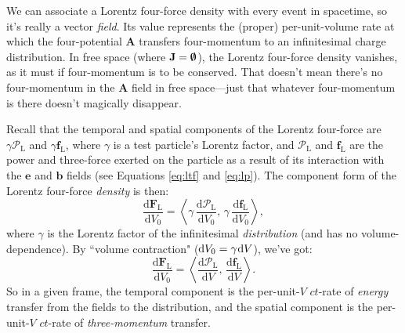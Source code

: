\documentclass[12pt]{article}
\renewcommand{\vv}[1]{\mathbf{#1}}
\newcommand{\dd}[1]{\mathrm{d}#1}
\begin{document}
We can associate a Lorentz four-force density with every event in spacetime, so it's really a vector \emph{field}. Its value represents the (proper) per-unit-volume rate at which the four-potential $\vv A$ transfers four-momentum to an infinitesimal charge distribution. In free space (where $\vv J = \textrm{\mbox{\boldmath $\emptyset$}}$), the Lorentz four-force density vanishes, as it must if four-momentum is to be conserved. That doesn't mean there's no four-momentum in the $\vv A$ field in free space---just that whatever four-momentum is there doesn't magically disappear.

Recall that the temporal and spatial components of the Lorentz four-force are $\gamma \mathcal{P}_{\mathrm{L}}$ and $\gamma \vv f_{\textrm{L}}$, where $\gamma$ is a test particle's Lorentz factor, and $\mathcal{P}_{\mathrm{L}}$ and $\vv f_{\textrm{L}}$ are the power and three-force exerted on the particle as a result of its interaction with the $\vv e$ and $\vv b$ fields (see Equations \ref{eq:ltf} and \ref{eq:lp}). The component form of the Lorentz four-force \emph{density} is then:
\begin{equation*}
\dfrac{\dd \vv F_{\mathrm{L}}}{\dd V_0} = \left \langle \gamma \, \dfrac{\dd \mathcal{P}_{\textrm{L}} }{\dd V_0}, \, \gamma \, \dfrac{\dd \vv f_{\textrm{L}}}{\dd V_0} \right \rangle,
\end{equation*}
where $\gamma$ is the Lorentz factor of the infinitesimal \emph{distribution} (and has no volume-dependence). By ``volume contraction" ($\dd V_0 = \gamma \mkern1mu \dd V$), we've got:
\begin{equation}\label{eq:lffdc}
\dfrac{\dd \vv F_{\mathrm{L}}}{\dd V_0} = \left \langle \dfrac{\dd \mathcal{P}_{\mathrm{L}}}{\dd V}, \, \dfrac{\dd \vv f_{\mathrm{L}}}{\dd V} \right \rangle .
\end{equation}
So in a given frame, the temporal component is the per-unit-$V$ $ct$-rate of \emph{energy} transfer from the fields to the distribution, and the spatial component is the per-unit-$V$ $ct$-rate of \emph{three-momentum} transfer.
\end{document}
